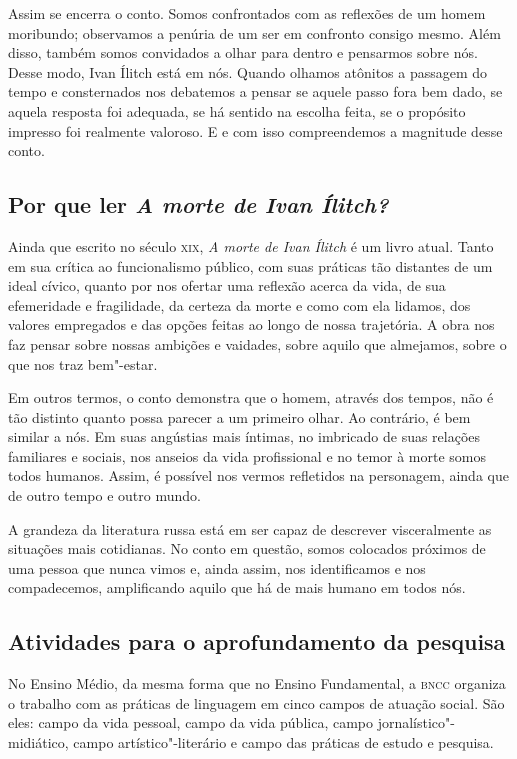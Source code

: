 \documentclass[12pt]{extarticle}
\begin{document}
Assim se encerra o conto. Somos confrontados com as reflexões de
um homem moribundo; observamos a penúria de um ser em confronto consigo
mesmo. Além disso, também somos convidados a olhar para dentro e pensarmos
sobre nós. Desse modo, Ivan Ílitch está em nós. Quando olhamos atônitos
a passagem do tempo e consternados nos debatemos a pensar se aquele
passo fora bem dado, se aquela resposta foi adequada, se há sentido na
escolha feita, se o propósito impresso foi realmente valoroso. 
E e com isso compreendemos a magnitude desse conto.

\subsection{Por que ler \emph{A morte de Ivan Ílitch?}}

Ainda que escrito no século \textsc{xix}, \emph{A morte de Ivan Ílitch} é um livro
atual. Tanto em sua crítica ao funcionalismo público, com suas práticas
tão distantes de um ideal cívico, quanto por nos
ofertar uma reflexão acerca da vida, de sua efemeridade e fragilidade,
da certeza da morte e como com ela lidamos, dos valores empregados e das
opções feitas ao longo de nossa trajetória. A obra nos faz pensar sobre nossas
ambições e vaidades, sobre aquilo que almejamos, sobre o que nos traz
bem"-estar.

Em outros termos, o conto demonstra que o homem, através dos tempos, não
é tão distinto quanto possa parecer a um primeiro olhar. Ao contrário, é
bem similar a nós. Em suas angústias mais íntimas, no imbricado de suas
relações familiares e sociais, nos anseios da vida profissional e no
temor à morte somos todos humanos. Assim, é possível nos vermos
refletidos na personagem, ainda que de outro tempo e outro mundo.

A grandeza da literatura russa está em ser capaz de descrever
visceralmente as situações mais cotidianas. No conto em questão, somos
colocados próximos de uma pessoa que nunca vimos e, ainda 
assim, nos identificamos e nos
compadecemos, amplificando aquilo que há de mais humano em todos nós.




\subsection{Atividades para o aprofundamento da pesquisa}

No Ensino Médio, da mesma forma que no Ensino Fundamental, a \textsc{bncc}
organiza o trabalho com as práticas de linguagem em cinco campos
de atuação social. São eles: campo da vida pessoal, campo da vida
pública, campo jornalístico"-midiático, campo artístico"-literário e campo
das práticas de estudo e pesquisa.
\end{document}
